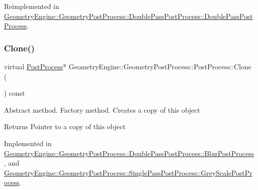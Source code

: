 Reimplemented in \mbox{\hyperlink{class_geometry_engine_1_1_geometry_post_process_1_1_double_pass_post_process_1_1_double_pass_post_process_a1caac8d2ec6f65de1bb98edd88ba14c6}{Geometry\+Engine\+::\+Geometry\+Post\+Process\+::\+Double\+Pass\+Post\+Process\+::\+Double\+Pass\+Post\+Process}}.

\mbox{\label{class_geometry_engine_1_1_geometry_post_process_1_1_post_process_aa80749cf09041335f6b3bda3aaf31711}} 
\subsubsection{\texorpdfstring{Clone()}{Clone()}}
{\footnotesize\ttfamily virtual \mbox{\hyperlink{class_geometry_engine_1_1_geometry_post_process_1_1_post_process}{Post\+Process}}$\ast$ Geometry\+Engine\+::\+Geometry\+Post\+Process\+::\+Post\+Process\+::\+Clone (\begin{DoxyParamCaption}{ }\end{DoxyParamCaption}) const\hspace{0.3cm}{\ttfamily [pure virtual]}}

Abstract method. Factory method. Creates a copy of this object \begin{DoxyReturn}{Returns}
Pointer to a copy of this object 
\end{DoxyReturn}


Implemented in \mbox{\hyperlink{class_geometry_engine_1_1_geometry_post_process_1_1_double_pass_post_process_1_1_blur_post_process_a4399f435326724c64cf255a40479d330}{Geometry\+Engine\+::\+Geometry\+Post\+Process\+::\+Double\+Pass\+Post\+Process\+::\+Blur\+Post\+Process}}, and \mbox{\hyperlink{class_geometry_engine_1_1_geometry_post_process_1_1_single_pass_post_process_1_1_grey_scale_post_process_a36f198711874587c9cbf5c958e6d09ea}{Geometry\+Engine\+::\+Geometry\+Post\+Process\+::\+Single\+Pass\+Post\+Process\+::\+Grey\+Scale\+Post\+Process}}.

\mbox{\label{class_geometry_engine_1_1_geometry_post_process_1_1_post_process_aba093c175b228894204e785a5a54e6e9}} 
